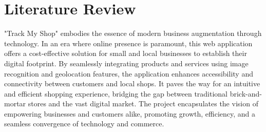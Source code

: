 \vspace{0.5cm}
\section{Literature Review}
"Track My Shop" embodies the essence of modern business augmentation through technology. In an era where online presence is paramount, this web application offers a cost-effective solution for small and local businesses to establish their digital footprint. By seamlessly integrating products and services using image recognition and geolocation features, the application enhances accessibility and connectivity between customers and local shops. It paves the way for an intuitive and efficient shopping experience, bridging the gap between traditional brick-and-mortar stores and the vast digital market. The project encapsulates the vision of empowering businesses and customers alike, promoting growth, efficiency, and a seamless convergence of technology and commerce.


